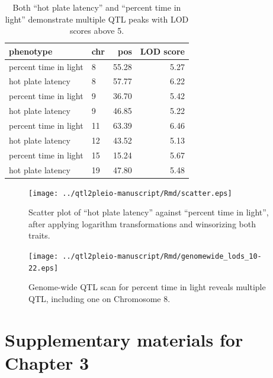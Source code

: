 \documentclass[oneside]{book}\usepackage[]{graphicx}\usepackage[]{color}
\begin{document}
\begin{appendices}
\begin{table}
\caption{Both ``hot plate latency'' and ``percent time in light''
  demonstrate multiple QTL peaks with LOD scores above 5.}
  \label{table-peaks}
\begin{center}
\begin{tabular}{l|lrr}
  \hline
phenotype & chr & pos & LOD score \\
   \hline
percent time in light & 8 & 55.28 & 5.27 \\
 hot plate latency & 8 & 57.77 & 6.22 \\
 percent time in light & 9 & 36.70 & 5.42 \\
 hot plate latency & 9 & 46.85 & 5.22 \\
 percent time in light & 11 & 63.39 & 6.46 \\
 hot plate latency & 12 & 43.52 & 5.13 \\
 percent time in light & 15 & 15.24 & 5.67 \\
 hot plate latency & 19 & 47.80 & 5.48 \\
   \hline
\end{tabular}
\end{center}
\end{table}







\clearpage


\renewcommand{\thefigure}{\textbf{S\arabic{figure}}}
\setcounter{figure}{0}

\begin{figure}
\texttt{[image: ../qtl2pleio-manuscript/Rmd/scatter.eps]}
\caption{Scatter plot of ``hot plate latency'' against ``percent time in
  light'', after applying logarithm transformations and winsorizing
  both traits.}
\label{fig:scatter}
\end{figure}


\begin{figure}
\texttt{[image: ../qtl2pleio-manuscript/Rmd/genomewide\_lods\_10-22.eps]}
\caption{Genome-wide QTL scan for percent time in light reveals
  multiple QTL, including one on Chromosome 8.}
\label{fig:genomewide10-22}
\end{figure}

\chapter{Supplementary materials for Chapter 3}


\end{appendices}
\end{document}
